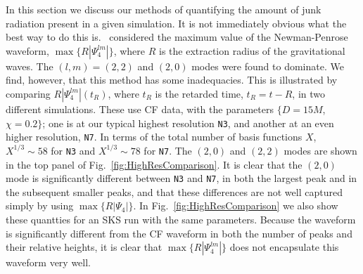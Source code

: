 In this section we discuss our methods of
quantifying the amount of junk radiation present in a given
simulation. It is not immediately obvious what the best way to do this
is.~\cite{Lovelace2009} considered the
maximum value of the Newman-Penrose waveform,
$\max\{R|\Psi_4^{lm}|\}$, where $R$ is the extraction radius of the gravitational waves.  The
  $(l,m)=(2,2)$ and $(2,0)$ modes were found to dominate. We find,
  however, that this method has some inadequacies. This is illustrated
  by comparing $R|\Psi_4^{lm}|(t_R)$, where $t_R$ is the retarded time,
  $t_R=t-R$, in two different simulations. These use CF data, with the parameters $\{D=15M$, $\chi=0.2\}$; one is at our
  typical highest resolution {\tt N3}, and another at an even higher
  resolution, {\tt N7}. In terms of the total number of basis
    functions $X$, $X^{1/3}\sim58$ for {\tt N3} and $X^{1/3}\sim78$ for
    {\tt N7}. The $(2,0)$ and $(2,2)$ modes are shown in the top panel of
  Fig.~\ref{fig:HighResComparison}. It is clear that the $(2,0)$ mode
  is significantly different between {\tt  N3} and {\tt N7}, in both the
  largest peak and in the subsequent smaller peaks, and that these
  differences are not well captured simply by using
  $\max\{R|\Psi_4|\}$. In Fig.~\ref{fig:HighResComparison} we also
  show these quantties for an SKS run with the same parameters. Because
  the waveform is significantly different from the CF waveform in both the
  number of peaks and their relative heights, it is clear that
  $\max\{R|\Psi_4^{lm}|\}$ does not encapsulate this waveform very well.


